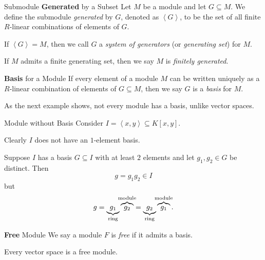\documentclass[co439]{subfiles}
\begin{document}
    \rruleline
    
    \begin{definition}{Submodule \textbf{Generated} by a Subset}
        Let $M$ be a module and let $G\subseteq M$. We define the submodule \emph{generated} by $G$, denoted as $\left< G \right>$, to be the set of all finite $R$-linear combinations of elements of $G$.

        If $\left< G \right> = M$, then we call $G$ a \emph{system of generators} (or \emph{generating set}) for $M$. 

        If $M$ admits a finite generating set, then we say $M$ is \emph{finitely generated}.
    \end{definition}

    \begin{definition}{\textbf{Basis} for a Module}
        If every element of a module $M$ can be written uniquely as a $R$-linear combination of elements of $G\subseteq M$, then we say $G$ is a \emph{basis} for $M$.
    \end{definition}

    \np As the next example shows, not every module has a basis, unlike vector spaces.

    \begin{example}{Module without Basis}
        Consider $I = \left< x,y \right> \subseteq K\left[ x,y \right]$.

        Clearly $I$ does not have an $1$-element basis.

        Suppose $I$ has a basis $G\subseteq I$ with at least $2$ elements and let $g_1,g_2\in G$ be distinct. Then
        \begin{equation*}
            g = g_1g_2\in I
        \end{equation*}
        but
        \begin{equation*}
            g = \underbrace{g_1}_{\clap{\scriptsize ring}}\overbrace{g_2}^{\clap{\scriptsize module}} = \underbrace{g_2}_{\clap{\scriptsize ring}}\overbrace{g_1}^{\clap{\scriptsize module}}.
        \end{equation*}
    \end{example}

    \rruleline

    \begin{definition}{\textbf{Free} Module}
        We say a module $F$ is \emph{free} if it admits a basis.
    \end{definition}

    \begin{example}{}
        Every vector space is a free module.
    \end{example}
\end{document}
